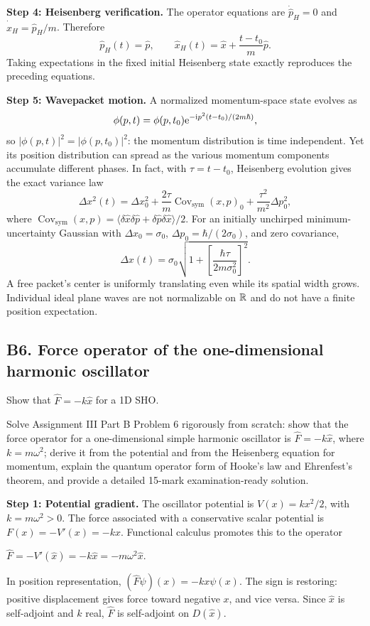 \documentclass[11pt,a4paper]{article}
\newcommand{\key}[1]{\begin{resultbox}\centering\(\displaystyle #1\)\end{resultbox}}
\newcommand{\avg}[1]{\langle #1\rangle}\newcommand{\Sch}{Schr\"odinger}
\begin{document}
\textbf{Step 4: Heisenberg verification.} The operator equations are \(\dot{\hat p}_H=0\) and \(\dot{\hat x}_H=\hat p_H/m\). Therefore
\begin{equation}\boxed{\hat p_H(t)=\hat p,\qquad\hat x_H(t)=\hat x+\frac{t-t_0}{m}\hat p.}\end{equation}
Taking expectations in the fixed initial Heisenberg state exactly reproduces the preceding equations.

\textbf{Step 5: Wavepacket motion.} A normalized momentum-space state evolves as
\begin{equation}\phi(p,t)=\phi(p,t_0)\mathrm{e}^{-\mathrm{i} p^2(t-t_0)/(2m\hbar)},\end{equation}
so \(|\phi(p,t)|^2=|\phi(p,t_0)|^2\): the momentum distribution is time independent. Yet its position distribution can spread as the various momentum components accumulate different phases. In fact, with \(\tau=t-t_0\), Heisenberg evolution gives the exact variance law
\begin{equation}\boxed{\Delta x^2(t)=\Delta x_0^2+\frac{2\tau}{m}\operatorname{Cov}_{\mathrm{sym}}(x,p)_0+\frac{\tau^2}{m^2}\Delta p_0^2,}\end{equation}
where \(\operatorname{Cov}_{\mathrm{sym}}(x,p)=\avg{\delta\hat x\delta\hat p+\delta\hat p\delta\hat x}/2\). For an initially unchirped minimum-uncertainty Gaussian with \(\Delta x_0=\sigma_0\), \(\Delta p_0=\hbar/(2\sigma_0)\), and zero covariance,
\begin{equation}\boxed{\Delta x(t)=\sigma_0\sqrt{1+\left[\frac{\hbar\tau}{2m\sigma_0^2}\right]^2}.}\end{equation}
A free packet's center is uniformly translating even while its spatial width grows. Individual ideal plane waves are not normalizable on \(\mathbb R\) and do not have a finite position expectation.

\subsection{B6. Force operator of the one-dimensional harmonic oscillator}
\begin{questionbox}
Show that \(\hat F=-k\hat x\) for a 1D SHO.
\end{questionbox}
\begin{studybox}
Solve Assignment III Part B Problem 6 rigorously from scratch: show that the force operator for a one-dimensional simple harmonic oscillator is \(\hat F=-k\hat x\), where \(k=m\omega^2\); derive it from the potential and from the Heisenberg equation for momentum, explain the quantum operator form of Hooke's law and Ehrenfest's theorem, and provide a detailed 15-mark examination-ready solution.
\end{studybox}
\textbf{Step 1: Potential gradient.} The oscillator potential is \(V(x)=kx^2/2\), with \(k=m\omega^2>0\). The force associated with a conservative scalar potential is \(F(x)=-V'(x)=-kx\). Functional calculus promotes this to the operator
\key{\boxed{\hat F=-V'(\hat x)=-k\hat x=-m\omega^2\hat x.}}
In position representation, \((\hat F\psi)(x)=-kx\psi(x)\). The sign is restoring: positive displacement gives force toward negative \(x\), and vice versa. Since \(\hat x\) is self-adjoint and \(k\) real, \(\hat F\) is self-adjoint on \(D(\hat x)\).
\end{document}
